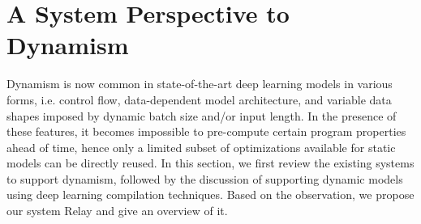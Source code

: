 



\section{A System Perspective to Dynamism}
\label{sec:Relay-background}


Dynamism is now common in state-of-the-art deep learning models in various forms, i.e. control flow, data-dependent model architecture, and variable data shapes imposed by dynamic batch size and/or input length.
In the presence of these features, it becomes impossible to pre-compute certain program properties ahead of time, hence only a limited subset of optimizations available for static models can be directly reused.
In this section, we first review the existing systems to support dynamism, followed by the discussion of supporting dynamic models using deep learning compilation techniques. Based on the observation, we propose our system Relay and give an overview of it.

